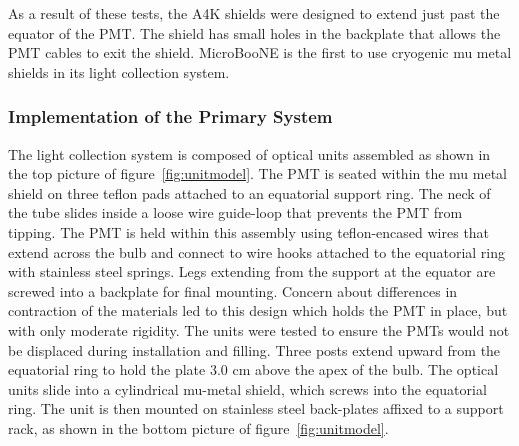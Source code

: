 As a result of these tests, the A4K shields were designed to extend just past the equator of the PMT.  The shield has small holes in the backplate that allows the PMT cables to exit the shield.   MicroBooNE is the first \lartpc to use cryogenic mu metal shields in its light collection system.  


\subsubsection{Implementation of the Primary System \label{LCUnitimplement}}


The light collection system is composed of optical units assembled as shown in the top picture of figure~\ref{fig:unitmodel}.  The PMT is seated within the mu metal shield on three teflon pads attached to an equatorial support ring.  The neck of the tube slides inside a loose wire guide-loop that prevents the PMT from tipping.  The PMT is held within this assembly using teflon-encased wires that extend across the bulb and connect to wire hooks attached to the equatorial ring with stainless steel springs. Legs extending from the support at the equator are screwed into a backplate for final mounting.  Concern about differences in contraction of the materials led to this design which holds the PMT in place, but with only moderate rigidity.  The units were tested to ensure the PMTs would not be displaced during installation and filling.  Three posts extend upward from the equatorial ring to hold the plate 3.0 cm above the apex of the bulb.   The optical units slide into a cylindrical mu-metal shield, which screws into the equatorial ring.  The unit is then mounted on stainless steel back-plates affixed to a support rack, as shown in the bottom picture of figure~\ref{fig:unitmodel}.


